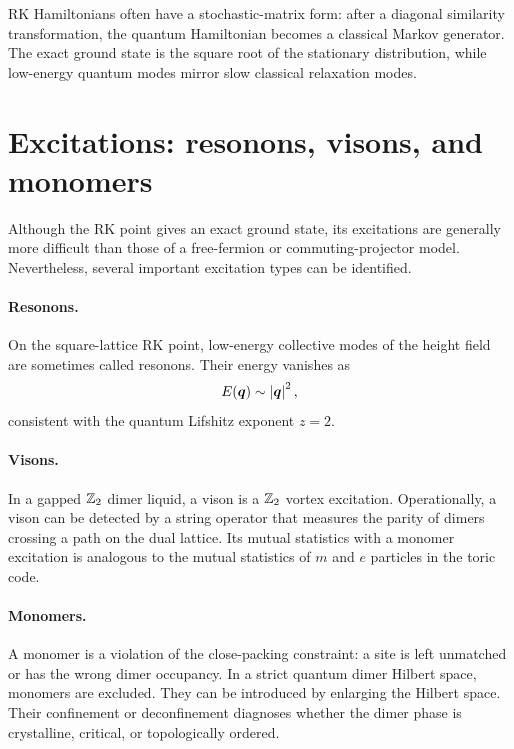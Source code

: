 \begin{principle}
RK Hamiltonians often have a stochastic-matrix form: after a diagonal similarity
transformation, the quantum Hamiltonian becomes a classical Markov generator.
The exact ground state is the square root of the stationary distribution, while
low-energy quantum modes mirror slow classical relaxation modes.
\end{principle}

\section{Excitations: resonons, visons, and monomers}
\label{sec:qdm-excitations}

Although the RK point gives an exact ground state, its excitations are generally
more difficult than those of a free-fermion or commuting-projector model.
Nevertheless, several important excitation types can be identified.

\paragraph{Resonons.}
On the square-lattice RK point, low-energy collective modes of the height field
are sometimes called resonons.  Their energy vanishes as
\begin{equation}
\label{eq:resonon-dispersion}
    E(\bm q)\sim \left|\bm q\right|^2,
\end{equation}
consistent with the quantum Lifshitz exponent \(z=2\).

\paragraph{Visons.}
In a gapped \(\mathbb{Z}_2\) dimer liquid, a vison is a \(\mathbb{Z}_2\) vortex excitation.
Operationally, a vison can be detected by a string operator that measures the
parity of dimers crossing a path on the dual lattice.  Its mutual statistics
with a monomer excitation is analogous to the mutual statistics of \(m\) and
\(e\) particles in the toric code.

\paragraph{Monomers.}
A monomer is a violation of the close-packing constraint: a site is left
unmatched or has the wrong dimer occupancy.  In a strict quantum dimer Hilbert
space, monomers are excluded.  They can be introduced by enlarging the Hilbert
space.  Their confinement or deconfinement diagnoses whether the dimer phase is
crystalline, critical, or topologically ordered.

